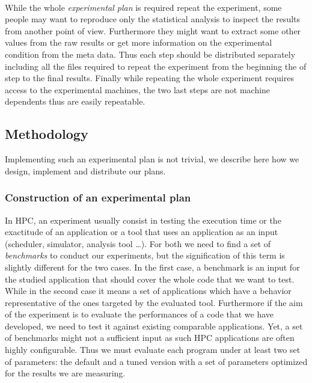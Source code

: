 \paragraph{}
While the whole \emph{experimental plan} is required repeat the experiment, some people may want to reproduce only the statistical analysis to inspect the results from another point of view.
Furthermore they might want to extract some other values from the raw results or get more information on the experimental condition from the meta data.
Thus each step should be distributed separately including all the files required to repeat the experiment from the beginning the of step to the final results.
Finally while repeating the whole experiment requires access to the experimental machines, the two last steps are not machine dependents thus are easily repeatable.

\subsection{Methodology}

Implementing such an experimental plan is not trivial, we describe here how we design, implement and distribute our plans.

\subsubsection{Construction of an experimental plan}

In \gls{HPC}, an experiment usually consist in testing the execution time or the exactitude of an application or a tool that uses an application as an input (scheduler, simulator, analysis tool \ldots).
For both we need to find a set of \emph{benchmarks} to conduct our experiments, but the signification of this term is slightly different for the two cases.
In the first case, a benchmark is an input for the studied application that should cover the whole code that we want to test.
While in the second case it means a set of applications which have a behavior representative of the ones targeted by the evaluated tool.
Furthermore if the aim of the experiment is to evaluate the performances of a code that we have developed, we need to test it against existing comparable applications.
Yet, a set of benchmarks might not a sufficient input as such \gls{HPC} applications are often highly configurable.
Thus we must evaluate each program under at least two set of parameters: the default and a tuned version with a set of parameters optimized for the results we are measuring.

